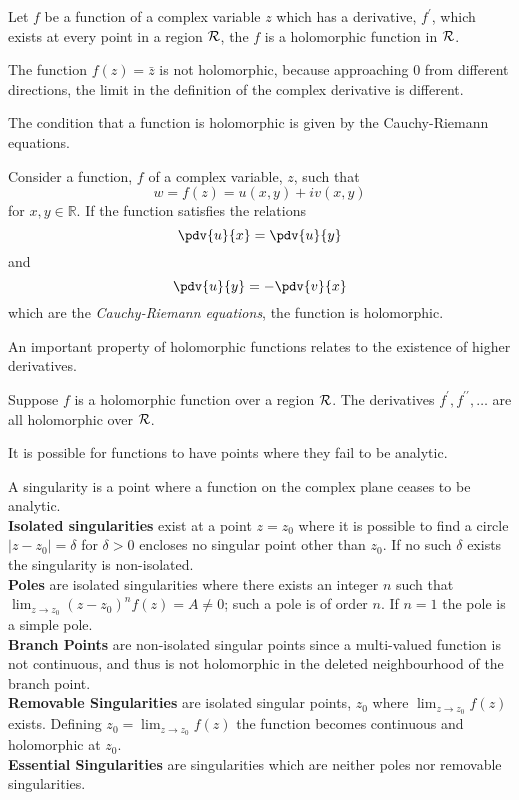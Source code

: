 \begin{definition}
  Let $f$ be a function of a complex variable $z$ which has a
  derivative, $f^{\prime}$, which exists at every point in a region
  ${\cal R}$, the $f$ is a holomorphic function in ${\cal R}$.
\end{definition}
\begin{example}
  The function $f(z) = \bar{z}$ is not holomorphic, because
  approaching $0$ from different directions, the limit in the
  definition of the complex derivative is different.
\end{example}
The condition that a function is holomorphic is given by the
Cauchy-Riemann equations.
\begin{theorem}
  Consider a function, $f$ of a complex variable, $z$, such that
  \[ w = f(z) = u(x,y) + i v(x,y) \] for $x,y \in \mathbb{R}$. If the
  function satisfies the relations
  \[ \pdv{u}{x} = \pdv{u}{y} \] and \[ \pdv{u}{y} = - \pdv{v}{x} \]
  which are the \emph{Cauchy-Riemann equations}, the function is
  holomorphic.
\end{theorem}
An important property of holomorphic functions relates to the
existence of higher derivatives.
\begin{theorem}
  Suppose $f$ is a holomorphic function over a region ${\cal R}$. The
  derivatives $f^{\prime}, f^{\prime \prime}, \dots$ are all holomorphic
  over ${\cal R}$.
\end{theorem}

It is possible for functions to have points where they fail to be analytic.
\begin{definition}[Singularity]
  A singularity is a point where a function on the complex plane
  ceases to be analytic.\\
  \textbf{Isolated singularities} exist at a point $z=z_0$ where it is
  possible to find a circle $|z-z_0|=\delta$ for $\delta>0$ encloses
  no singular point other than $z_0$. If no such $\delta$ exists the
  singularity is non-isolated. \\
  \textbf{Poles} are isolated singularities where there exists an
  integer $n$ such that $\lim_{z \to z_0} (z -z_0)^n f(z) = A \neq 0$;
  such a pole is of order $n$. If $n=1$ the pole is a simple pole.\\
  \textbf{Branch Points} are non-isolated singular points since a
  multi-valued function is not continuous, and thus is not holomorphic
  in the deleted neighbourhood of the branch point.\\
  \textbf{Removable Singularities} are isolated singular points, $z_0$
  where $\lim_{z \to z_0} f(z)$ exists. Defining $z_0 = \lim_{z \to
    z_0} f(z)$ the function becomes continuous and holomorphic at
  $z_0$.  \\ \textbf{Essential Singularities} are singularities which
  are neither poles nor removable singularities.
\end{definition}

